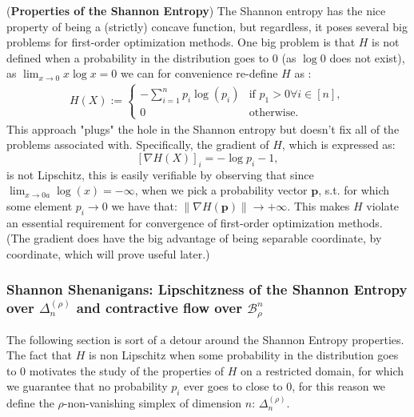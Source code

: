 \begin{observation}
    (\textbf{Properties of the Shannon Entropy}) The Shannon entropy has the nice property of being a (strictly) concave function, but regardless, it poses several big problems for first-order optimization methods. One big problem is that $H$ is not defined when a probability in the distribution goes to $0$ (as $\log 0$ does not exist), as $\lim_{x \rightarrow 0} x \log x = 0$ we can for convenience re-define $H$ as : 
    \begin{align*}
        H(X) := \begin{cases}
            - \sum^n_{i=1}p_i \log(p_i) & \text{if } p_1 >0 \forall i \in [n], \\
            0 & \text{otherwise. } 
        \end{cases}
    \end{align*}
    This approach "plugs" the hole in the Shannon entropy but doesn't fix all of the problems associated with. Specifically, the gradient of $H$, which is expressed as:
    \[ [\nabla H (X)]_i = - \log p_i - 1, \]
    is not Lipschitz, this is easily verifiable by observing that since $\lim_{x\rightarrow 0 a} \log(x) = -\infty$, when we pick a probability vector $\bm{p}$, s.t. for which some element $p_i \rightarrow 0$ we have that: $\| \nabla H (\bm{p})\| \rightarrow + \infty$. This makes $H$ violate an essential requirement for convergence of first-order optimization methods.
    (The gradient does have the big advantage of being separable coordinate, by coordinate, which will prove useful later.)
\end{observation}

\subsubsection{Shannon Shenanigans: Lipschitzness of the Shannon Entropy over $\Delta^{(\rho)}_n$ and contractive flow over $\mathcal{B}^n_\rho$}

The following section is sort of a detour around the Shannon Entropy properties. The fact that $H$ is non Lipschitz when some probability in the distribution goes to $0$ motivates the study of the properties of $H$ on a restricted domain, for which we guarantee that no probability $p_i$ ever goes to close to $0$, for this reason we define the $\rho$-non-vanishing simplex of dimension $n$: $\Delta^{(\rho)}_n$.

